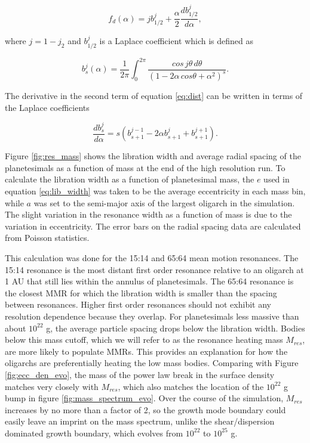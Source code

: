 \begin{equation}\label{eq:dist}
f_{d}(\alpha) = j b_{1/2}^{j} + \frac{\alpha}{2}\frac{d b_{1/2}^{j}}{d \alpha},
\end{equation}

\noindent \cite{winter97} where $j = 1 - j_{2}$ and $b_{1/2}^{j}$ is a Laplace coefficient which is defined as

\begin{equation}\label{eq:lap}
b_{s}^{j}(\alpha) = \frac{1}{2 \pi} \int_{0}^{2 \pi} \frac{cos \, j \theta \, d \theta}{\left( 1 - 2 \alpha \, cos \theta + \alpha^2 \right)^{s}}.
\end{equation}

\noindent The derivative in the second term of equation \ref{eq:dist} can be written in terms of the Laplace coefficients 
\cite{murray00}

\begin{equation}\label{eq:lap_d}
\frac{d b_{s}^{j}}{d \alpha} = s \left( b_{s+1}^{j-1} - 2 \alpha b_{s+1}^{j} + b_{s+1}^{j+1} \right).
\end{equation}

Figure \ref{fig:res_mass} shows the libration width and average radial spacing of the planetesimals as a function of mass at the 
end of the high resolution run. To calculate the libration width as a function of planetesimal mass, the $e$ used in equation 
\ref{eq:lib_width} was taken to be the average eccentricity in each mass bin, while $a$ was set to the semi-major axis of the 
largest oligarch in the simulation. The slight variation in the resonance width as a function of mass is due to the variation in 
eccentricity. The error bars on the radial spacing data are calculated from Poisson statistics.

This calculation was done for the 15:14 and 65:64 mean motion resonances. The 15:14 resonance is the most distant first order 
resonance relative to an oligarch at 1 AU that still lies within the annulus of planetesimals. The 65:64 resonance is the closest 
MMR for which the libration width is smaller than the spacing between resonances. Higher first order resonances should not 
exhibit any resolution dependence because they overlap. For planetesimals less massive than about $10^{22}$ g, the average 
particle spacing drops below the libration width. Bodies below this mass cutoff, which we will refer to as the resonance heating 
mass $M_{res}$, are more likely to populate MMRs. This provides an explanation for how the oligarchs are preferentially heating 
the low mass bodies. Comparing with Figure \ref{fig:ecc_den_evo}, the mass of the power law break in the surface density 
matches very closely with $M_{res}$, which also matches the location of the $10^{22}$ g bump in figure 
\ref{fig:mass_spectrum_evo}. Over the course of the simulation, $M_{res}$ increases by no more than a factor of 2, so the 
growth mode boundary could easily leave an imprint on the mass spectrum, unlike the shear/dispersion dominated growth 
boundary, which evolves from $10^{22}$ to $10^{25}$ g.

